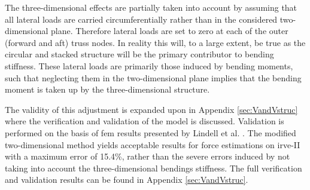 The three-dimensional effects are partially taken into account by assuming that all lateral loads are carried circumferentially rather than in the considered two-dimensional plane. Therefore lateral loads are set to zero at each of the outer (forward and aft) truss nodes. In reality this will, to a large extent, be true as the circular and stacked structure will be the primary contributor to bending stiffness. These lateral loads are primarily those induced by bending moments, such that neglecting them in the two-dimensional plane implies that the bending moment is taken up by the three-dimensional structure. 

The validity of this adjustment is expanded upon in Appendix \ref{sec:VandVstruc} where the verification and validation of the model is discussed. Validation is performed on the basis of \gls{fem} results presented by Lindell et al. \cite{Lindell2006}. The modified two-dimensional method yields acceptable results for force estimations on \gls{irve}-II with a maximum error of 15.4\%, rather than the severe errors induced by not taking into account the three-dimensional bendings stiffness. The full verification and validation results can be found in Appendix \ref{sec:VandVstruc}.

